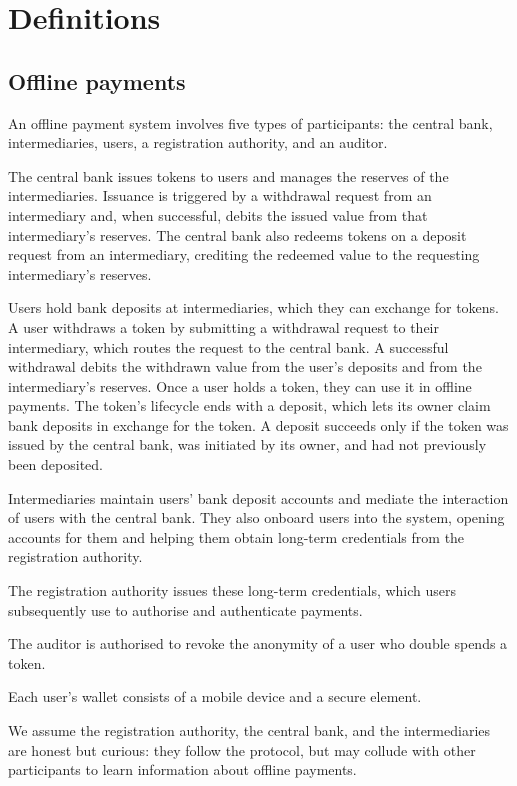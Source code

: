 \section{Definitions}\label{sec:offline-definitions}

\subsection{Offline payments}

An offline payment system involves five types of participants: the central bank,
intermediaries, users, a registration authority, and an auditor.

The central bank issues tokens to users and manages the reserves of the
intermediaries. Issuance is triggered by a withdrawal request from an
intermediary and, when successful, debits the issued value from that
intermediary's reserves. The central bank also redeems tokens on a deposit
request from an intermediary, crediting the redeemed value to the requesting
intermediary's reserves.

Users hold bank deposits at intermediaries, which they can exchange for tokens.
A user withdraws a token by submitting a withdrawal request to their
intermediary, which routes the request to the central bank. A successful
withdrawal debits the withdrawn value from the user's deposits and from the
intermediary's reserves. Once a user holds a token, they can use it in offline
payments. The token's lifecycle ends with a deposit, which lets its owner claim
bank deposits in exchange for the token. A deposit succeeds only if the token
was issued by the central bank, was initiated by its owner, and had not
previously been deposited.

Intermediaries maintain users' bank deposit accounts and mediate the interaction
of users with the central bank. They also onboard users into the system, opening
accounts for them and helping them obtain long-term credentials from the
registration authority.

The registration authority issues these long-term credentials, which users
subsequently use to authorise and authenticate payments.

The auditor is authorised to revoke the anonymity of a user who double spends
a token.

Each user's wallet consists of a mobile device and a secure element.

We assume the registration authority, the central bank, and the intermediaries
are honest but curious: they follow the protocol, but may collude with other
participants to learn information about offline payments.

